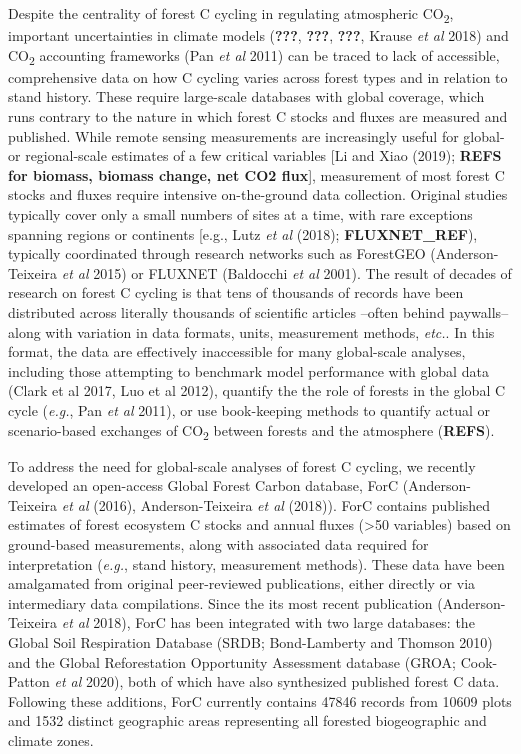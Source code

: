 \documentclass[
]{article}
\begin{document}
Despite the centrality of forest C cycling in regulating atmospheric
CO\textsubscript{2}, important uncertainties in climate models
({\textbf{???}}, {\textbf{???}}, {\textbf{???}}, Krause \emph{et al}
2018) and CO\textsubscript{2} accounting frameworks (Pan \emph{et al}
2011) can be traced to lack of accessible, comprehensive data on how C
cycling varies across forest types and in relation to stand history.
These require large-scale databases with global coverage, which runs
contrary to the nature in which forest C stocks and fluxes are measured
and published. While remote sensing measurements are increasingly useful
for global- or regional-scale estimates of a few critical variables
{[}Li and Xiao (2019); \textbf{REFS for biomass, biomass change, net CO2
flux}{]}, measurement of most forest C stocks and fluxes require
intensive on-the-ground data collection. Original studies typically
cover only a small numbers of sites at a time, with rare exceptions
spanning regions or continents {[}e.g., Lutz \emph{et al} (2018);
\textbf{FLUXNET\_REF}), typically coordinated through research networks
such as ForestGEO (Anderson-Teixeira \emph{et al} 2015) or FLUXNET
(Baldocchi \emph{et al} 2001). The result of decades of research on
forest C cycling is that tens of thousands of records have been
distributed across literally thousands of scientific articles --often
behind paywalls-- along with variation in data formats, units,
measurement methods, \emph{etc.}. In this format, the data are
effectively inaccessible for many global-scale analyses, including those
attempting to benchmark model performance with global data (Clark et al
2017, Luo et al 2012), quantify the the role of forests in the global C
cycle (\emph{e.g.}, Pan \emph{et al} 2011), or use book-keeping methods
to quantify actual or scenario-based exchanges of CO\textsubscript{2}
between forests and the atmosphere (\textbf{REFS}).

To address the need for global-scale analyses of forest C cycling, we
recently developed an open-access Global Forest Carbon database, ForC
(Anderson-Teixeira \emph{et al} (2016), Anderson-Teixeira \emph{et al}
(2018)). ForC contains published estimates of forest ecosystem C stocks
and annual fluxes (\textgreater50 variables) based on ground-based
measurements, along with associated data required for interpretation
(\emph{e.g.}, stand history, measurement methods). These data have been
amalgamated from original peer-reviewed publications, either directly or
via intermediary data compilations. Since the its most recent
publication (Anderson-Teixeira \emph{et al} 2018), ForC has been
integrated with two large databases: the Global Soil Respiration
Database (SRDB; Bond-Lamberty and Thomson 2010) and the Global
Reforestation Opportunity Assessment database (GROA; Cook-Patton
\emph{et al} 2020), both of which have also synthesized published forest
C data. Following these additions, ForC currently contains 47846 records
from 10609 plots and 1532 distinct geographic areas representing all
forested biogeographic and climate zones.
\end{document}
